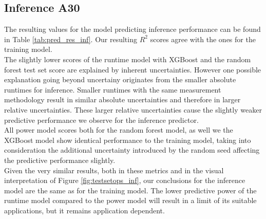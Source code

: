 \subsection{Inference A30}

The resulting values for the model predicting inference performance can be found in Table \ref{tab:pred_res_inf}. Our resulting $R^2$ scores agree with the ones for the training model. \\
The slightly lower scores of the runtime model with XGBoost and the random forest test set score are explained by inherent uncertainties. However one possible explanation going beyond uncertainy originates from the smaller absolute runtimes for inference. Smaller runtimes with the same measurement methodology result in similar absolute uncertainties and therefore in larger relative uncertainties. These larger relative uncertainties cause the slightly weaker predictive performance we observe for the inference predictor.\\
All power model scores both for the random forest model, as well we the XGBoost model show identical performance to the training model, taking into consideration the additional uncertainty introduced by the random seed affecting the predictive performance slightly. \\
Given the very similar results, both in these metrics and in the visual interpretation of Figure \ref{fig:testsetops_inf}, our conclusions for the inference model are the same as for the training model. The lower predictive power of the runtime model compared to the power model will result in a limit of its suitable applications, but it remains application dependent. 



